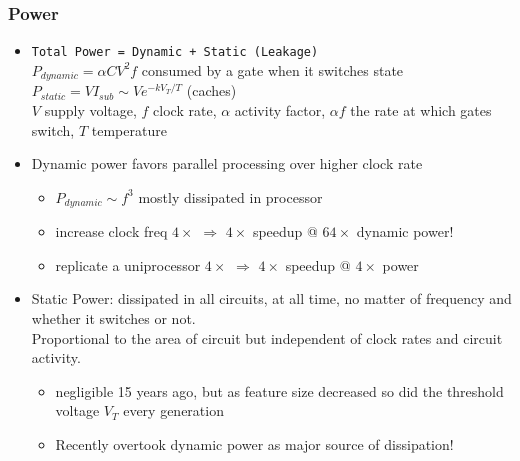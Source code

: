 \documentclass{beamer}
\newcommand{\emp}[1]{\textcolor{DikuRed}{ #1}}
\begin{document}
\begin{frame}[fragile,t]
\frametitle{Power}

\begin{itemize}
    \item \emp{\tt Total Power = Dynamic + Static (Leakage)}\\
                        $P_{dynamic} = \alpha C V^2 f$ 
                        consumed by a gate when it switches state\\
                        $P_{static}  = V I_{sub} \sim V e^{-k V_T / T}$ 
                        (caches)\\
    {\tiny $V$ supply voltage, $f$ clock rate, $\alpha$ activity factor, $\alpha f$ the rate at which gates switch, $T$ temperature}\medskip
            

    \item Dynamic power 
            favors parallel processing over higher clock rate
            \begin{itemize}
                \item $P_{dynamic} \sim f^3$ mostly dissipated in processor\pause
                \item increase clock freq $4\times$ $\Rightarrow$ \pause
                        $4\times$ speedup @ $64\times$ dynamic power!
                \item replicate a uniprocessor $4\times$ $\Rightarrow$ 
                        $4\times$ speedup @ $4\times$ power
            \end  {itemize}\medskip

    \item Static Power: dissipated in all circuits,  
                at all time, no matter of frequency and whether
                it switches or not.\\ 
            {\tiny Proportional to the area of circuit but independent of clock rates and circuit activity.}
            \begin{itemize}
                \item negligible 15 years ago, but as feature size 
                        decreased so did the threshold voltage $V_T$ 
                        every generation
                \item \alert{Recently overtook dynamic power as major 
                        source of dissipation!}
            \end{itemize}\medskip


\end{itemize}
\end{frame}
\end{document}
